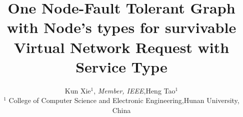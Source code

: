 \documentclass[10pt,journal,letterpaper]{IEEEtran}
\begin{document}
\title{One Node-Fault Tolerant Graph with Node's types for survivable Virtual Network Request with Service Type}
\author{Kun Xie$^1$, \emph{Member, IEEE},Heng Tao$^1$\\
$^1$ College of Computer Science and Electronic Engineering,Hunan University, China\\}

\maketitle
\vspace{-3em}














\end{document}
